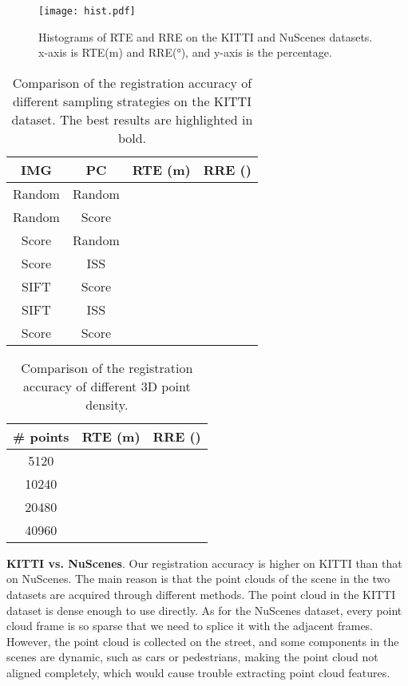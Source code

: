 \documentclass[lettersize,journal]{IEEEtran}
\begin{document}
\begin{figure}[h]
\centering
\texttt{[image: hist.pdf]}
\caption{Histograms of RTE and RRE on the KITTI and NuScenes datasets. x-axis is RTE(m) and RRE(°), and y-axis is the percentage.}
\label{FIG8}
\end{figure}

\begin{table}[t]
    \centering
    \renewcommand\arraystretch{1.5}
    \caption{Comparison of the registration accuracy of different sampling strategies on the KITTI dataset. The best results are highlighted in bold.}
\begin{tabular}{c|c|c|c}
    \hline\hline
      IMG & PC & RTE (m) & RRE () \\
    \hline
    Random & Random   &  &  \\
    \hline
    Random & Score  &  &  \\
    \hline
    Score & Random &  &  \\
    \hline
    Score & ISS  &  &   \\
    \hline
    SIFT & Score &  & \\
    \hline
    SIFT & ISS & &\\
    \hline
    Score & Score&  &  \\
    \hline\hline
    \end{tabular} \label{TAB2}
\end{table}

\begin{table}[t]
    \centering
    \renewcommand\arraystretch{1.5}
    \caption{Comparison of the registration accuracy of different 3D point density.}
\begin{tabular}{c|c|c}
    \hline\hline
      \# points & RTE (m) & RRE () \\
    \hline
    5120    &  &  \\
    \hline
    10240   &  &  \\
    \hline
    20480  &  &  \\
    \hline
    40960   &  &   \\
    \hline\hline
    \end{tabular} \label{TAB3}
\end{table}



\noindent\textbf{KITTI vs. NuScenes}.
Our registration accuracy is higher on   KITTI than that on NuScenes. The main reason is that the point clouds of the scene in the two datasets are acquired through different methods. The point cloud in the KITTI dataset is dense enough to use directly.
As for the NuScenes dataset, every point cloud frame is so sparse that we need to splice it with the adjacent frames. However, the point cloud is collected on the street, and some components in the scenes are dynamic, such as cars or pedestrians, making the point cloud not aligned completely, which would cause trouble extracting point cloud features.
\end{document}

